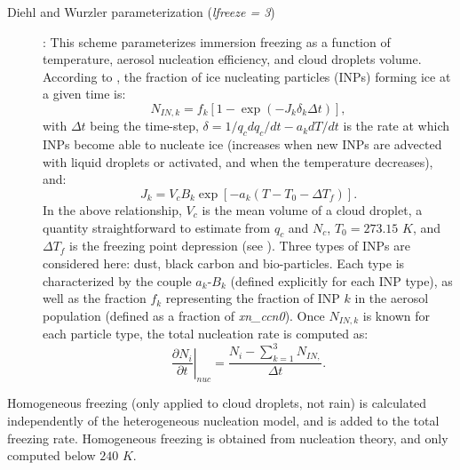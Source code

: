 \documentclass[12pt,A4,french]{article}
\begin{document}
\begin{description}
    \item[Diehl and Wurzler parameterization ({\it lfreeze = 3})]: This scheme parameterizes immersion freezing as a function of temperature, aerosol nucleation efficiency, and cloud droplets volume. According to \cite{DW2004}, the fraction of ice nucleating particles (INPs) forming ice at a given time is:
\begin{equation}
    N_{IN,k} = f_k \left[1 - \exp\left(- J_k \delta_k \Delta t\right)\right],
\end{equation}
with $\Delta t$ being the time-step, $\delta = 1/q_c dq_c/dt - a_k dT/dt$ is the rate at which INPs become able to nucleate ice (increases when new INPs are advected with liquid droplets or activated, and when the temperature decreases), and:
\begin{equation}
    J_k = V_c B_k \exp\left[-a_k\left(T - T_0 - \Delta T_f\right)\right].
\end{equation}
In the above relationship, $V_c$ is the mean volume of a cloud droplet, a quantity straightforward to estimate from $q_c$ and $N_c$, $T_0 = 273.15$ $K$, and $\Delta T_f$ is the freezing point depression (see \cite{DW2004}). Three types of INPs are considered here: dust, black carbon and bio-particles. Each type is characterized by the  couple $a_k$-$B_k$ (defined explicitly for each INP type), as well as the fraction $f_k$ representing the fraction of INP $k$ in the aerosol population (defined as a fraction of {\it xn\_ccn0}). Once $N_{IN,k}$ is known for each particle type, the total nucleation rate is computed as:
\begin{equation}
\left.\frac{\partial N_{i}}{\partial t}\right|_{nuc} = \frac{N_{i} - \sum_{k=1}^3 N_{IN,}}{\Delta t}.
\end{equation}

\end{description}

Homogeneous freezing (only applied to cloud droplets, not rain) is calculated independently of the heterogeneous nucleation model, and is added to the total freezing rate. Homogeneous freezing is obtained from nucleation theory, and only computed below $240$ $K$.  
\end{document}
